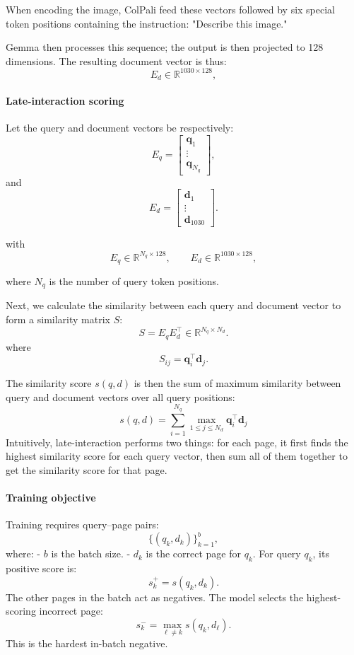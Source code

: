 \documentclass[11pt,a4paper]{article}
\begin{document}
When encoding the image, ColPali feed these vectors followed by six special token positions containing the instruction: "Describe this image."

Gemma then processes this sequence; the output is then projected to 128 dimensions. The resulting document vector is thus:
\[
E_d\in\mathbb{R}^{1030\times128},
\]

\paragraph{Late-interaction scoring} Let the query and document vectors be respectively:
\[
E_q=
\begin{bmatrix}
\mathbf{q}_1\\
\vdots\\
\mathbf{q}_{N_q}
\end{bmatrix},
\]
and 
\[
E_d=
\begin{bmatrix}
\mathbf{d}_1\\
\vdots\\
\mathbf{d}_{1030}
\end{bmatrix}.
\]

with 
\[
E_q\in\mathbb{R}^{N_q\times128},
\qquad
E_d\in\mathbb{R}^{1030\times128},
\]

where $N_q$ is the number of query token positions.

Next, we calculate the similarity between each query and document vector to form a similarity matrix $S$:
\[
S=E_qE_d^\top
\in\mathbb{R}^{N_q\times N_d}.
\]
where 
\[
S_{ij}=\mathbf{q}_i^\top\mathbf{d}_j.
\]

The similarity score $s(q,d)$ is then the sum of maximum similarity between query and document vectors over all query positions:
\[
\boxed{
s(q,d)=
\sum_{i=1}^{N_q}
\max_{1\leq j\leq N_d}
\mathbf{q}_i^\top\mathbf{d}_j
}
\]
Intuitively, late-interaction performs two things: for each page, it first finds the highest similarity score for each query vector, then sum all of them together to get the similarity score for that page.

\paragraph{Training objective} 
Training requires query–page pairs:
\[
\{(q_k,d_k)\}_{k=1}^{b},
\]
where:
- \(b\) is the batch size.
- \(d_k\) is the correct page for \(q_k\).
For query \(q_k\), its positive score is:
\[
s_k^+=s(q_k,d_k).
\]
The other pages in the batch act as negatives. The model selects the highest-scoring incorrect page:
\[
s_k^-=
\max_{\ell\neq k}s(q_k,d_\ell).
\]
This is the hardest in-batch negative.
\end{document}
